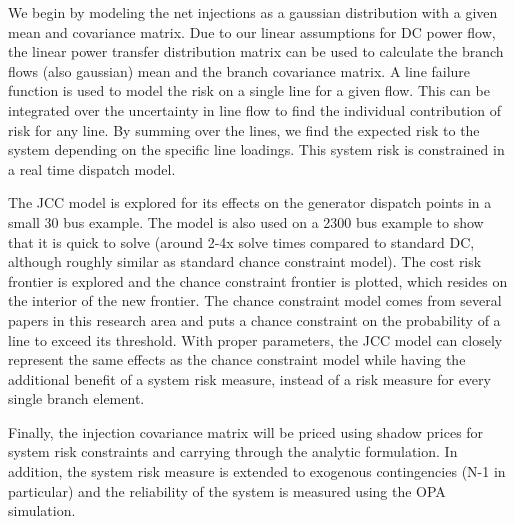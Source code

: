 We begin by modeling the net injections as a gaussian distribution with a given mean and covariance matrix.  Due to our linear assumptions for DC power flow, the linear power transfer distribution matrix can be used to calculate the branch flows (also gaussian) mean and the branch covariance matrix.  A line failure function is used to model the risk on a single line for a given flow.  This can be integrated over the uncertainty in line flow to find the individual contribution of risk for any line.  By summing over the lines, we find the expected risk to the system depending on the specific line loadings.  This system risk is constrained in a real time dispatch model.

The JCC model is explored for its effects on the generator dispatch points in a small 30 bus example. The model is also used on a 2300 bus example to show that it is quick to solve (around 2-4x solve times compared to standard DC, although roughly similar as standard chance constraint model).  The cost risk frontier is explored and the chance constraint frontier is plotted, which resides on the interior of the new frontier.  The chance constraint model comes from several papers in this research area and puts a chance constraint on the probability of a line to exceed its threshold.  With proper parameters, the JCC model can closely represent the same effects as the chance constraint model while having the additional benefit of a system risk measure, instead of a risk measure for every single branch element.

Finally, the injection covariance matrix will be priced using shadow prices for system risk constraints and carrying through the analytic formulation.  In addition, the system risk measure is extended to exogenous contingencies (N-1 in particular) and the reliability of the system is measured using the OPA simulation.
